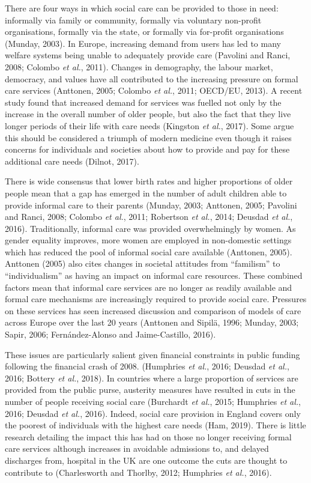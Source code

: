 \documentclass[12pt,a4paper,oneside,table]{report}
\begin{document}
There are four ways in which social care can be provided to those in
need: informally via family or community, formally via voluntary
non-profit organisations, formally via the state, or formally via
for-profit organisations (Munday, 2003). In Europe, increasing demand
from users has led to many welfare systems being unable to adequately
provide care (Pavolini and Ranci, 2008; Colombo \emph{et al.}, 2011).
Changes in demography, the labour market, democracy, and values have all
contributed to the increasing pressure on formal care services
(Anttonen, 2005; Colombo \emph{et al.}, 2011; OECD/EU, 2013). A recent
study found that increased demand for services was fuelled not only by
the increase in the overall number of older people, but also the fact
that they live longer periods of their life with care needs (Kingston
\emph{et al.}, 2017). Some argue this should be considered a triumph of
modern medicine even though it raises concerns for individuals and
societies about how to provide and pay for these additional care needs
(Dilnot, 2017).

There is wide consensus that lower birth rates and higher proportions of
older people mean that a gap has emerged in the number of adult children
able to provide informal care to their parents (Munday, 2003; Anttonen,
2005; Pavolini and Ranci, 2008; Colombo \emph{et al.}, 2011; Robertson
\emph{et al.}, 2014; Deusdad \emph{et al.}, 2016). Traditionally,
informal care was provided overwhelmingly by women. As gender equality
improves, more women are employed in non-domestic settings which has
reduced the pool of informal social care available (Anttonen, 2005).
Anttonen (2005) also cites changes in societal attitudes from
``familism'' to ``individualism'' as having an impact on informal care
resources. These combined factors mean that informal care services are
no longer as readily available and formal care mechanisms are
increasingly required to provide social care. Pressures on these
services has seen increased discussion and comparison of models of care
across Europe over the last 20 years (Anttonen and Sipilä, 1996; Munday,
2003; Sapir, 2006; Fernández-Alonso and Jaime-Castillo, 2016).

These issues are particularly salient given financial constraints in
public funding following the financial crash of 2008. (Humphries
\emph{et al.}, 2016; Deusdad \emph{et al.}, 2016; Bottery \emph{et al.},
2018). In countries where a large proportion of services are provided
from the public purse, austerity measures have resulted in cuts in the
number of people receiving social care (Burchardt \emph{et al.}, 2015;
Humphries \emph{et al.}, 2016; Deusdad \emph{et al.}, 2016). Indeed,
social care provision in England covers only the poorest of individuals
with the highest care needs (Ham, 2019). There is little research
detailing the impact this has had on those no longer receiving formal
care services although increases in avoidable admissions to, and delayed
discharges from, hospital in the UK are one outcome the cuts are thought
to contribute to (Charlesworth and Thorlby, 2012; Humphries \emph{et
al.}, 2016).
\end{document}
